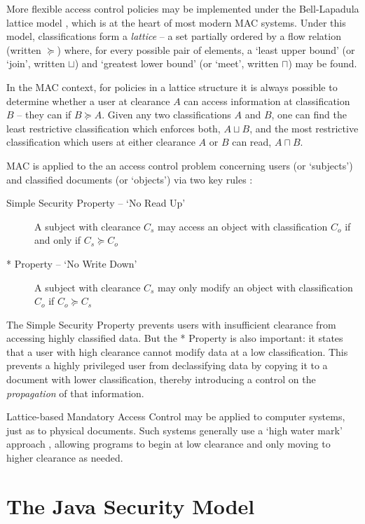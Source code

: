 More flexible access control policies may be implemented under the Bell-Lapadula lattice model \cite{bell1973lattice}, which is at the heart of most modern MAC systems. Under this model, classifications form a \textit{lattice} -- a set partially ordered by a flow relation (written $ \succeq $) where, for every possible pair of elements, a `least upper bound' (or `join', written $ \sqcup $) and `greatest lower bound' (or `meet', written $ \sqcap $) may be found.

In the MAC context, for policies in a lattice structure it is always possible to determine whether a user at clearance $ A $ can access information at classification $ B $ -- they can if $ B \succeq A $. Given any two classifications $ A $ and $ B $, one can find the least restrictive classification which enforces both, $ A \sqcup B $, and the most restrictive classification which users at either clearance $ A $ or $ B $ can read, $ A \sqcap B $.

MAC is applied to the an access control problem concerning users (or `subjects') and classified documents (or `objects') via two key rules \cite{sandhu1993lattice}:

\begin{description}
	\item[Simple Security Property -- `No Read Up'] A subject with clearance $ C_s $ may access an object with classification $ C_o $ if and only if $ C_s \succeq C_o $
	
	\item[* Property -- `No Write Down'] A subject with clearance $ C_s $ may only modify an object with classification $ C_o $ if $ C_o \succeq C_s $
\end{description}

The Simple Security Property prevents users with insufficient clearance from accessing highly classified data. But the * Property is also important: it states that a user with high clearance cannot modify data at a low classification. This prevents a highly privileged user from declassifying data by copying it to a document with lower classification, thereby introducing a control on the \textit{propagation} of that information.

Lattice-based Mandatory Access Control may be applied to computer systems, just as to physical documents. Such systems generally use a `high water mark' approach \cite{jones1975highwatermark}, allowing programs to begin at low clearance and only moving to higher clearance as needed.

\section{The Java Security Model}


